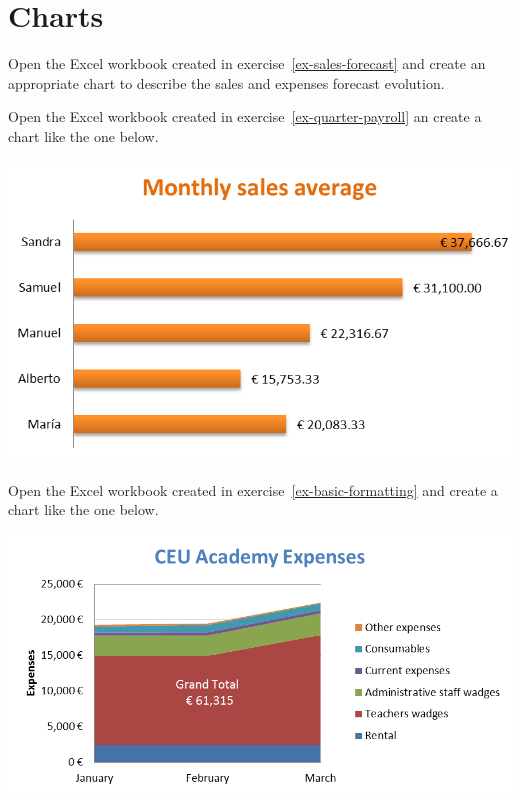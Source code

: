 
\section{Charts}
\item Open the Excel workbook created in exercise~\ref{ex-sales-forecast} and create an appropriate chart to describe
the sales and expenses forecast evolution. 

\item Open the Excel workbook created in exercise~\ref{ex-quarter-payroll} an create a chart like the one below. 
\begin{center}
\includegraphics[scale=0.8]{img/quarter-payroll}
\end{center}

\item Open the Excel workbook created in exercise~\ref{ex-basic-formatting} and create a chart like the one below.
\begin{center}
\includegraphics[scale=0.8]{img/basic-formatting}
\end{center}

